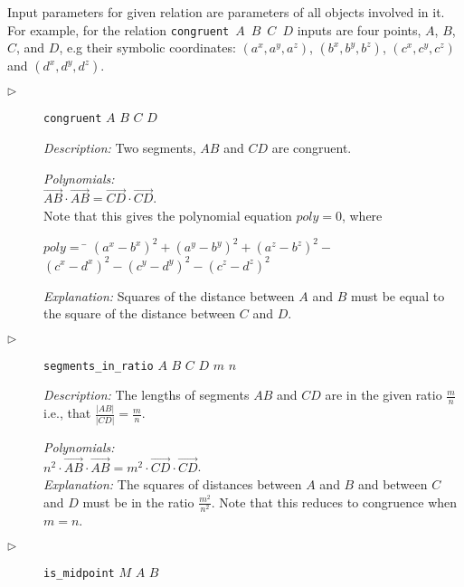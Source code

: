 \documentclass[final,1p,times,authoryear]{elsarticle}
\begin{document}
Input parameters for given relation are parameters of all objects
involved in it. For example, for the relation \mbox{{\tt congruent}
  $A$ $B$ $C$ $D$} inputs are four points, $A$, $B$, $C$, and $D$, e.g
their symbolic coordinates: $(a^x, a^y, a^z)$, $(b^x, b^y, b^z)$,
$(c^x, c^y, c^z)$ and $(d^x, d^y, d^z)$.

\begin{description}
\item[$\triangleright$] {\tt congruent} $A$ $B$ $C$ $D$

  {\em Description:} Two segments, $AB$ and $CD$ are
  congruent.


{\em Polynomials:} \\
$\overrightarrow{AB} \cdot \overrightarrow{AB} = \overrightarrow{CD} \cdot \overrightarrow{CD}$. \\
Note that this gives the polynomial equation $poly = 0$, where

\begin{tabbing}
$poly = $ \= $({a^x} - {b^x})^2 + ({a^y} - {b^y})^2 + ({a^z} - {b^z})^2 -$ \\ 
          \> $({c^x} - {d^x})^2 - ({c^y} - {d^y})^2 - ({c^z} - {d^z})^2$
\end{tabbing}

{\em Explanation:} Squares of the distance between $A$ and $B$ must be
equal to the square of the distance between $C$ and $D$.

\item[$\triangleright$] {\tt segments\_in\_ratio} $A$ $B$ $C$ $D$
  $m$ $n$ 

  {\em Description:} The lengths of segments $AB$ and
  $CD$ are in the given ratio $\frac{m}{n}$ i.e., that
  $\frac{|AB|}{|CD|} = \frac{m}{n}$.

{\em Polynomials:} \\
$n^2 \cdot \overrightarrow{AB} \cdot \overrightarrow{AB} = m^2 \cdot \overrightarrow{CD} \cdot \overrightarrow{CD}$. \\


{\em Explanation:} The squares of distances between $A$ and $B$ and
between $C$ and $D$ must be in the ratio $\frac{m^2}{n^2}$. Note that
this reduces to congruence when $m = n$.

\item[$\triangleright$] {\tt is\_midpoint} $M$ $A$ $B$


\end{description}
\end{document}
